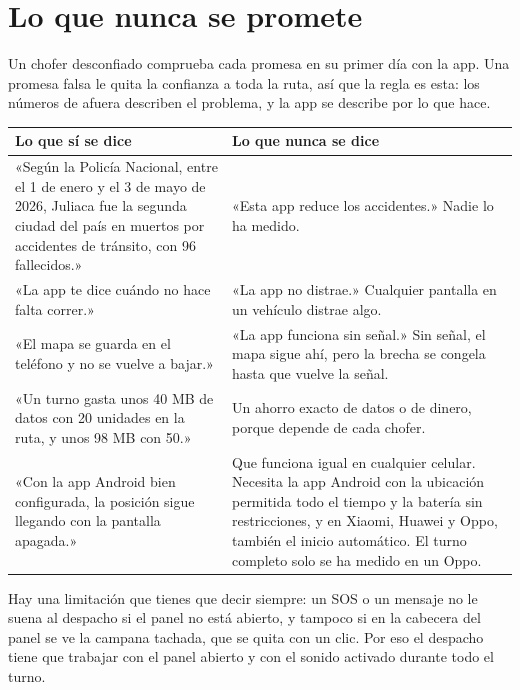\documentclass[a4paper]{article}
\begin{document}
\section{Lo que nunca se promete}

Un chofer desconfiado comprueba cada promesa en su primer día con la app. Una promesa falsa le quita la confianza a toda la ruta, así que la regla es esta: los números de afuera describen el problema, y la app se describe por lo que hace.

\begin{center}
\begin{tabularx}{\linewidth}{@{}XX@{}}
\toprule
\textbf{Lo que sí se dice} & \textbf{Lo que nunca se dice}\\
\midrule
«Según la Policía Nacional, entre el 1 de enero y el 3 de mayo de 2026, Juliaca fue la segunda ciudad del país en muertos por accidentes de tránsito, con 96 fallecidos.» & «Esta app reduce los accidentes.» Nadie lo ha medido.\\
«La app te dice cuándo no hace falta correr.» & «La app no distrae.» Cualquier pantalla en un vehículo distrae algo.\\
«El mapa se guarda en el teléfono y no se vuelve a bajar.» & «La app funciona sin señal.» Sin señal, el mapa sigue ahí, pero la brecha se congela hasta que vuelve la señal.\\
«Un turno gasta unos 40 MB de datos con 20 unidades en la ruta, y unos 98 MB con 50.» & Un ahorro exacto de datos o de dinero, porque depende de cada chofer.\\
«Con la app Android bien configurada, la posición sigue llegando con la pantalla apagada.» & Que funciona igual en cualquier celular. Necesita la app Android con la ubicación permitida todo el tiempo y la batería sin restricciones, y en Xiaomi, Huawei y Oppo, también el inicio automático. El turno completo solo se ha medido en un Oppo.\\
\bottomrule
\end{tabularx}
\end{center}

Hay una limitación que tienes que decir siempre: un SOS o un mensaje no le suena al despacho si el panel no está abierto, y tampoco si en la cabecera del panel se ve la campana tachada, que se quita con un clic. Por eso el despacho tiene que trabajar con el panel abierto y con el sonido activado durante todo el turno.

\end{document}
